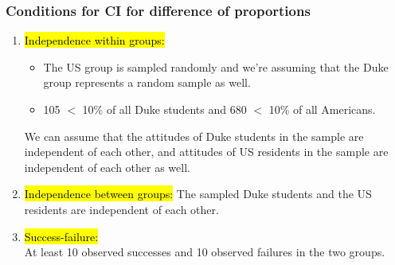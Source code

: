 \documentclass[slidestop,compress,mathserif]{beamer}
\begin{document}
\begin{frame}
\frametitle{Conditions for CI for difference of proportions}

\begin{enumerate}

\item \hl{Independence within groups: }
\begin{itemize}
\item The US group is sampled randomly and we're assuming that the Duke group represents a random sample as well.
\pause
\item 105 $<$ 10\% of all Duke students and 680 $<$ 10\% of all Americans.
\end{itemize}
\pause
We can assume that the attitudes of Duke students in the sample are independent of each other, and attitudes of US residents in the sample are independent of each other as well.

\pause

\item \hl{Independence between groups: }
The sampled Duke students and the US residents are independent of each other.

\pause

\item \hl{Success-failure:} \\
At least 10 observed successes and 10 observed failures in the two groups.

\end{enumerate}

\end{frame}

\end{document}
